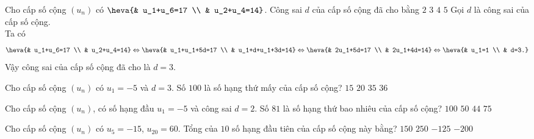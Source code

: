 \begin{ex}%
    Cho cấp số cộng $(u_n)$ có $\heva{& u_1+u_6=17 \\ & u_2+u_4=14}$. Công sai $d$ của cấp số cộng đã cho bằng
    \choice
    {$2$}
    {\True $3$}
    {$4$}
    {$5$}
    \loigiai
    { Gọi $d$ là công sai của cấp số cộng.\\
        Ta có $$\heva{& u_1+u_6=17 \\ & u_2+u_4=14}\Leftrightarrow\heva{& u_1+u_1+5d=17 \\ & u_1+d+u_1+3d=14}\Leftrightarrow \heva{& 2u_1+5d=17 \\ & 2u_1+4d=14}\Leftrightarrow\heva{& u_1=1 \\ & d=3.}$$
        Vậy công sai của cấp số cộng đã cho là $d=3$.
    }
\end{ex}
\begin{ex}%
    Cho cấp số cộng $(u_n)$ có $u_1=-5$ và $d=3$. Số $100$ là số hạng thứ mấy của cấp số cộng?
    \choice
    {$15$}
    {$20$}
    {$35$}
    {\True $36$}
\end{ex}
\begin{ex}%
    Cho cấp số cộng $(u_n)$, có số hạng đầu $u_1=-5$ và công sai $d=2$. Số $81$ là số hạng thứ bao nhiêu của cấp số cộng?
    \choice
    {$100$}
    {$50$}
    {\True $44$}
    {$75$}
\end{ex}
\begin{ex}%
    Cho cấp số cộng $(u_n)$ có $u_5=-15$, $u_{20}=60$. Tổng của $10$ số hạng đầu tiên của cấp số cộng này bằng?
    \choice
    {$150$}
    {$250$}
        {\True $-125$}
    {$-200$}
\end{ex}
